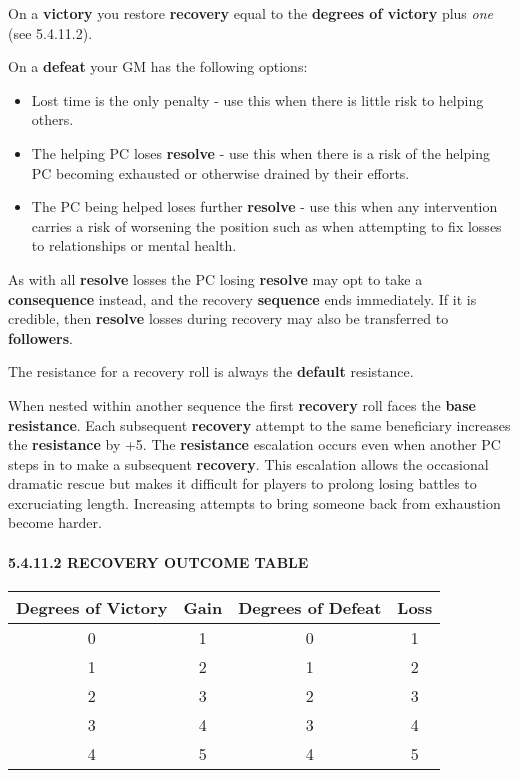 \documentclass[
  11pt,
]{article}
\providecommand{\tightlist}{%
  \setlength{\itemsep}{0pt}\setlength{\parskip}{0pt}}
\begin{document}
On a \textbf{victory} you restore \textbf{recovery} equal to the
\textbf{degrees of victory} plus \emph{one} (see 5.4.11.2).

On a \textbf{defeat} your GM has the following options:

\begin{itemize}
\tightlist
\item
  Lost time is the only penalty - use this when there is little risk to
  helping others.
\item
  The helping PC loses \textbf{resolve} - use this when there is a risk
  of the helping PC becoming exhausted or otherwise drained by their
  efforts.
\item
  The PC being helped loses further \textbf{resolve} - use this when any
  intervention carries a risk of worsening the position such as when
  attempting to fix losses to relationships or mental health.
\end{itemize}

As with all \textbf{resolve} losses the PC losing \textbf{resolve} may
opt to take a \textbf{consequence} instead, and the recovery
\textbf{sequence} ends immediately. If it is credible, then
\textbf{resolve} losses during recovery may also be transferred to
\textbf{followers}.

The resistance for a recovery roll is always the \textbf{default}
resistance.

When nested within another sequence the first \textbf{recovery} roll
faces the \textbf{base resistance}. Each subsequent \textbf{recovery}
attempt to the same beneficiary increases the \textbf{resistance} by +5.
The \textbf{resistance} escalation occurs even when another PC steps in
to make a subsequent \textbf{recovery}. This escalation allows the
occasional dramatic rescue but makes it difficult for players to prolong
losing battles to excruciating length. Increasing attempts to bring
someone back from exhaustion become harder.

\hypertarget{recovery-outcome-table}{%
\paragraph{5.4.11.2 RECOVERY OUTCOME
TABLE}\label{recovery-outcome-table}}

\begin{longtable}[]{@{}cccc@{}}
\toprule
Degrees of Victory & Gain & Degrees of Defeat & Loss \\
\midrule
\endhead
0 & 1 & 0 & 1 \\
1 & 2 & 1 & 2 \\
2 & 3 & 2 & 3 \\
3 & 4 & 3 & 4 \\
4 & 5 & 4 & 5 \\
\bottomrule
\end{longtable}
\end{document}
